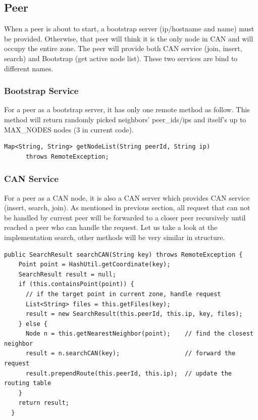 \documentclass[11pt, oneside]{article}   	%
\begin{document}
\subsection{Peer}
When a peer is about to start, a bootstrap server (ip/hostname and name) must be provided. Otherwise, that peer will think it is the only node in CAN and will occupy the entire zone.
The peer will provide both CAN service (join, insert, search) and Bootstrap (get active node list). These two services are bind to different names.

\subsubsection{Bootstrap Service}
For a peer as a bootstrap server, it has only one remote method as follow. This method will return randomly picked neighbors' peer\_ids/ips and itself's up to MAX\_NODES nodes (3 in current code).

\begin{lstlisting}
Map<String, String> getNodeList(String peerId, String ip)
      throws RemoteException;
\end{lstlisting}

\subsubsection{CAN Service}
For a peer as a CAN node, it is also a CAN server which provides CAN service (insert, search, join).
As mentioned in previous section, all request that can not be handled by current peer will be forwarded to a closer peer recursively until reached a peer who can handle the request.
Let us take a look at the implementation search, other methods will be very similar in structure.

\begin{lstlisting}
public SearchResult searchCAN(String key) throws RemoteException {
    Point point = HashUtil.getCoordinate(key);
    SearchResult result = null;
    if (this.containsPoint(point)) {
      // if the target point in current zone, handle request
      List<String> files = this.getFiles(key);
      result = new SearchResult(this.peerId, this.ip, key, files);
    } else {      
      Node n = this.getNearestNeighbor(point);    // find the closest neighbor
      result = n.searchCAN(key);                  // forward the request
      result.prependRoute(this.peerId, this.ip);  // update the routing table    
    }
    return result;
  }
\end{lstlisting}
\end{document}
